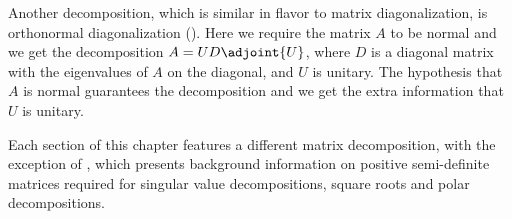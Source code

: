 %
\begin{para}Another decomposition, which is similar in flavor to matrix diagonalization, is orthonormal diagonalization ().  Here we require the matrix $A$ to be normal and we get the decomposition $A=UD\adjoint{U}$, where $D$ is a diagonal matrix with the eigenvalues of $A$ on the diagonal, and $U$ is unitary.  The hypothesis that $A$ is normal guarantees the decomposition and we get the extra information that $U$ is unitary.\end{para}
%
\begin{para}Each section of this chapter features a different matrix decomposition, with the exception of , which presents background information on positive semi-definite matrices required for singular value decompositions, square roots and polar decompositions.\end{para}